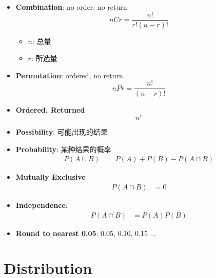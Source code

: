 \begin{multicols}{2}
\begin{itemize}
    \item \textbf{Combination}: no order, no return
    \begin{equation}
      n C r = \frac{n!}{r! \left( n - r \right)!}
    \end{equation}
    \begin{itemize}
      \item $ n $: 总量
      \item $ r $: 所选量
    \end{itemize}

    \item \textbf{Permutation}: ordered, no return
    \begin{equation}
      n P r = \frac{n!}{\left( n - r \right)!}
    \end{equation}

    \item \textbf{Ordered, Returned}
    \begin{equation}
      n^{r}
    \end{equation}

    \item \textbf{Possibility}: 可能出现的结果
    \item \textbf{Probability}: 某种结果的概率
    \begin{align}
      P\left( A \cup B \right) &= P\left( A \right) + P\left( B \right) - P\left( A \cap B \right)
    \end{align}

    \item \textbf{Mutually Exclusive}
    \begin{align}
      P\left( A \cap B \right) &= 0
    \end{align}

    \item \textbf{Independence}:
    \begin{align}
      P\left( A \cap B \right) &= P\left( A \right) P\left( B \right)
    \end{align}

    \item \textbf{Round to nearest 0.05}: 0.05, 0.10, 0.15 ...
  \end{itemize}
\end{multicols}

\section{Distribution}

